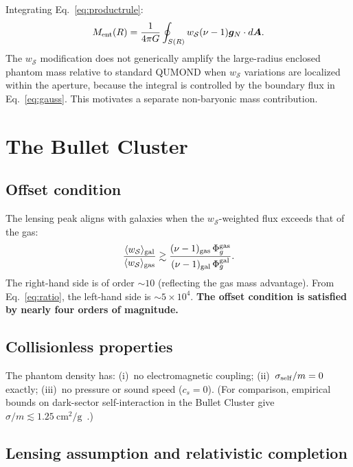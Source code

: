 \documentclass[aps,prd,twocolumn,superscriptaddress,nofootinbib]{revtex4-2}
\newcommand{\gN}{\bm{g}_N}
\newcommand{\wS}{w_{\mathcal{S}}}
\begin{document}
Integrating Eq.~\eqref{eq:productrule}:
\begin{equation}
M_{\rm ent}(R)=\frac{1}{4\pi G}\oint_{S(R)}\wS(\nu-1)\gN\cdot d\bm{A}.
\label{eq:gauss}
\end{equation}
The $\wS$ modification does not generically amplify the large-radius enclosed phantom mass relative to standard QUMOND when $\wS$ variations are localized within the aperture, because the integral is controlled by the boundary flux in Eq.~\eqref{eq:gauss}. This motivates a separate non-baryonic mass contribution.

\section{The Bullet Cluster}
\label{sec:bullet}

\subsection{Offset condition}

The lensing peak aligns with galaxies when the $\wS$-weighted flux exceeds that of the gas:
\begin{equation}
\frac{\langle\wS\rangle_{\rm gal}}{\langle\wS\rangle_{\rm gas}}\gtrsim\frac{(\nu-1)_{\rm gas}\,\Phi_g^{\rm gas}}{(\nu-1)_{\rm gal}\,\Phi_g^{\rm gal}}.
\label{eq:offset}
\end{equation}
The right-hand side is of order $\sim 10$ (reflecting the gas mass advantage). From Eq.~\eqref{eq:ratio}, the left-hand side is $\sim 5\times 10^4$. \textbf{The offset condition is satisfied by nearly four orders of magnitude.}

\subsection{Collisionless properties}

The phantom density has: (i)~no electromagnetic coupling; (ii)~$\sigma_{\rm self}/m=0$ exactly; (iii)~no pressure or sound speed ($c_s=0$). (For comparison, empirical bounds on dark-sector self-interaction in the Bullet Cluster give $\sigma/m\lesssim 1.25~\mathrm{cm}^2/\mathrm{g}$~\cite{Randall2008}.)

\subsection{Lensing assumption and relativistic completion}
\label{sec:lensing_assumption}
\end{document}
